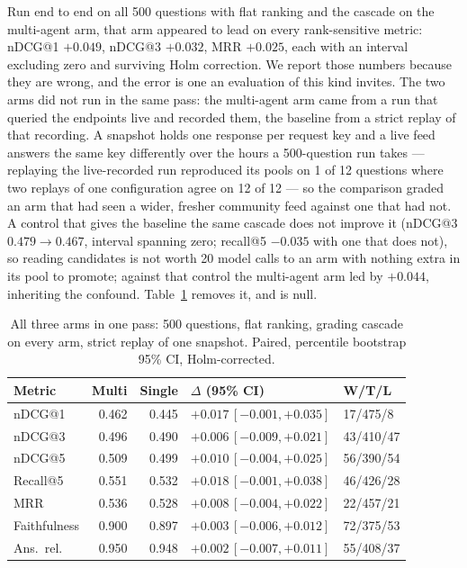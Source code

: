 \documentclass[10pt,conference]{IEEEtran}
\begin{document}
Run end to end on all 500 questions with flat ranking and the cascade on the
multi-agent arm, that arm appeared to lead on every rank-sensitive metric: nDCG@1
$+0.049$, nDCG@3 $+0.032$, MRR $+0.025$, each with an interval excluding zero and
surviving Holm correction. We report those numbers because they are wrong, and the
error is one an evaluation of this kind invites. The two arms did not run in the
same pass: the multi-agent arm came from a run that queried the endpoints live and
recorded them, the baseline from a strict replay of that recording. A snapshot
holds one response per request key and a live feed answers the same key
differently over the hours a 500-question run takes --- replaying the
live-recorded run reproduced its pools on 1 of 12 questions where two replays of
one configuration agree on 12 of 12 --- so the comparison graded an arm that had
seen a wider, fresher community feed against one that had not. A control that
gives the baseline the same cascade does not improve it (nDCG@3 $0.479 \to 0.467$,
interval spanning zero; recall@5 $-0.035$ with one that does not), so reading
candidates is not worth 20 model calls to an arm with nothing extra in its pool to
promote; against that control the multi-agent arm led by $+0.044$, inheriting the
confound. Table~\ref{tab:control} removes it, and is null.

\begin{table}[t]
\caption{All three arms in one pass: 500 questions, flat ranking, grading cascade
on every arm, strict replay of one snapshot. Paired, percentile bootstrap 95\% CI,
Holm-corrected.}
\label{tab:control}
\centering
\footnotesize
\setlength{\tabcolsep}{3pt}
\begin{tabular}{@{}lrrll@{}}
\toprule
Metric & Multi & Single & $\Delta$ (95\% CI) & W/T/L \\
\midrule
nDCG@1 & 0.462 & 0.445 & $+0.017\,[-0.001,+0.035]$ & 17/475/8 \\
nDCG@3 & 0.496 & 0.490 & $+0.006\,[-0.009,+0.021]$ & 43/410/47 \\
nDCG@5 & 0.509 & 0.499 & $+0.010\,[-0.004,+0.025]$ & 56/390/54 \\
Recall@5 & 0.551 & 0.532 & $+0.018\,[-0.001,+0.038]$ & 46/426/28 \\
MRR & 0.536 & 0.528 & $+0.008\,[-0.004,+0.022]$ & 22/457/21 \\
\midrule
Faithfulness & 0.900 & 0.897 & $+0.003\,[-0.006,+0.012]$ & 72/375/53 \\
Ans.\ rel. & 0.950 & 0.948 & $+0.002\,[-0.007,+0.011]$ & 55/408/37 \\
\bottomrule
\end{tabular}
\end{table}
\end{document}
